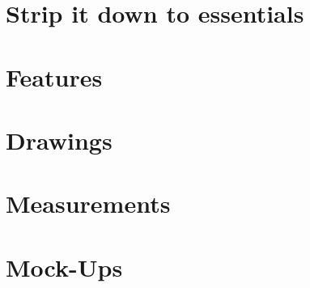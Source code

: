 \section{Strip it down to essentials}


\section{Features}


\section{Drawings}

\section{Measurements}

\section{Mock-Ups}
